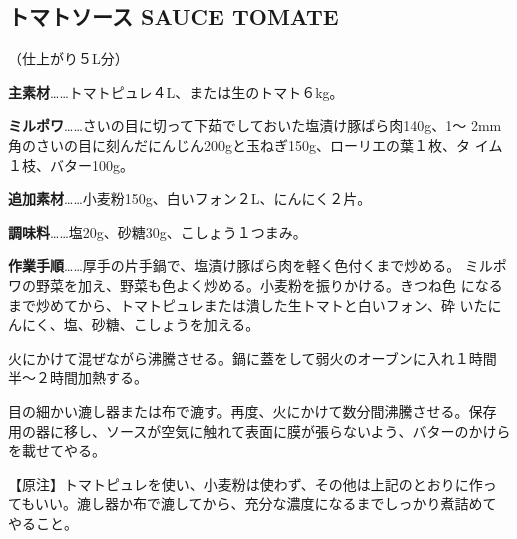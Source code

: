 \documentclass[twoside,12Q,b5paper]{escoffierltjsbook}
\begin{document}
\subsection{トマトソース SAUCE
TOMATE}\label{ux30c8ux30deux30c8ux30bdux30fcux30b9-sauce-tomate}

（仕上がり５L分）

\textbf{主素材}\ldots{}\ldots{}トマトピュレ４L、または生のトマト６kg。

\textbf{ミルポワ}\ldots{}\ldots{}さいの目に切って下茹でしておいた塩漬け豚ばら肉140g、1〜
2mm角のさいの目に刻んだにんじん200gと玉ねぎ150g、ローリエの葉１枚、タ
イム１枝、バター100g。

\textbf{追加素材}\ldots{}\ldots{}小麦粉150g、白いフォン２L、にんにく２片。

\textbf{調味料}\ldots{}\ldots{}塩20g、砂糖30g、こしょう１つまみ。

\textbf{作業手順}\ldots{}\ldots{}厚手の片手鍋で、塩漬け豚ばら肉を軽く色付くまで炒める。
ミルポワの野菜を加え、野菜も色よく炒める。小麦粉を振りかける。きつね色
になるまで炒めてから、トマトピュレまたは潰した生トマトと白いフォン、砕
いたにんにく、塩、砂糖、こしょうを加える。

火にかけて混ぜながら沸騰させる。鍋に蓋をして弱火のオーブンに入れ１時間
半〜２時間加熱する。

目の細かい漉し器または布で漉す。再度、火にかけて数分間沸騰させる。保存
用の器に移し、ソースが空気に触れて表面に膜が張らないよう、バターのかけら
を載せてやる。

【原注】トマトピュレを使い、小麦粉は使わず、その他は上記のとおりに作っ
てもいい。漉し器か布で漉してから、充分な濃度になるまでしっかり煮詰めて
やること。




\end{document}
